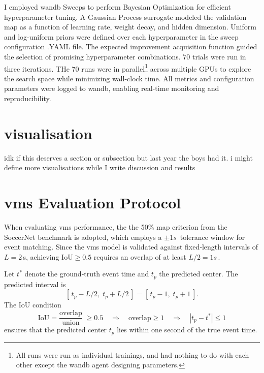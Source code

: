 I employed \acrshort{wandb} Sweeps to perform Bayesian Optimization for efficient hyperparameter tuning.  A Gaussian Process surrogate modeled the validation \acrshort{map} as a function of learning rate, weight decay, and hidden dimension. Uniform and log-uniform priors were defined over each hyperparameter in the sweep configuration .YAML file. The expected improvement acquisition function guided the selection of promising hyperparameter combinations. 70 trials were run in three iterations. THe 70 runs were in parallel\footnote{All runs were run as individual trainings, and had nothing to do with each other except the \acrshort{wandb} agent designing parameters. } across multiple GPUs to explore the search space while minimizing wall-clock time. All metrics and configuration parameters were logged to \acrshort{wandb}, enabling real-time monitoring and reproducibility. 




\section{visualisation}

idk if this deserves a section or subsection but last year the boys had it. i might define more visualisations while I write discussion and results

\section{\acrshort{vms} Evaluation Protocol}
When evaluating \acrshort{vms} performance, the the 50\% \acrshort{map} criterion from the SoccerNet benchmark is adopted, which employs a $\pm 1s\,$ tolerance window for event matching. Since the \acrshort{vms} model is validated against fixed‐length intervals of $L = 2\,$s, achieving $\mathrm{IoU}\ge0.5$ requires an overlap of at least $L/2 = 1s\,$.

Let $t^*$ denote the ground‐truth event time and $t_p$ the predicted center. The predicted interval is
\[
    [\,t_p - L/2,\;t_p + L/2\,]
    = [\,t_p - 1,\;t_p + 1\,].
\] 
The IoU condition
\[
    \mathrm{IoU}
    = \frac{\text{overlap}}{\text{union}}
    \;\ge0.5
    \quad\Longrightarrow\quad
    \text{overlap}\ge1
    \quad\Longrightarrow\quad
    |t_p - t^*|\le1
\]
ensures that the predicted center $t_p$ lies within one second of the true event time.

